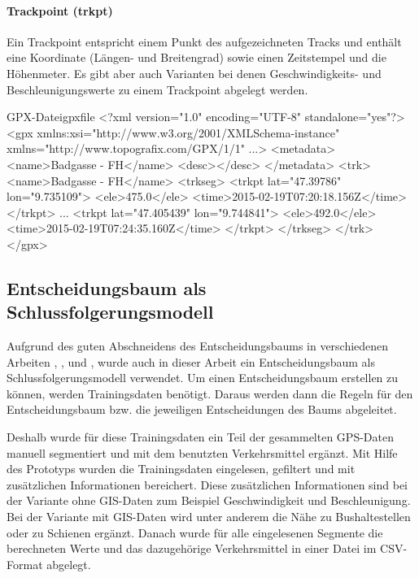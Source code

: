 \paragraph{Trackpoint (trkpt)}
Ein Trackpoint entspricht einem Punkt des aufgezeichneten Tracks und enthält eine Koordinate (Längen- und Breitengrad) sowie einen Zeitstempel und die Höhenmeter. Es gibt aber auch Varianten bei denen Geschwindigkeits- und Beschleunigungswerte zu einem Trackpoint abgelegt werden. \cite{topografix_gpx_2004}
 
\begin{code}[xml]{GPX-Datei}{gpxfile}
<?xml version="1.0" encoding="UTF-8" standalone="yes"?>
<gpx xmlns:xsi="http://www.w3.org/2001/XMLSchema-instance" xmlns="http://www.topografix.com/GPX/1/1" ...>
    <metadata>
        <name>Badgasse - FH</name>
        <desc></desc>
    </metadata>
    <trk>
        <name>Badgasse - FH</name>
        <trkseg>
            <trkpt lat="47.39786" lon="9.735109">
                <ele>475.0</ele>
                <time>2015-02-19T07:20:18.156Z</time>
            </trkpt>
            ...
            <trkpt lat="47.405439" lon="9.744841">
                <ele>492.0</ele>
                <time>2015-02-19T07:24:35.160Z</time>
            </trkpt>
        </trkseg>
    </trk>
</gpx>
\end{code}
\clearpage

\subsection{Entscheidungsbaum als Schlussfolgerungsmodell}
\label{entscheidungsbaumAlsSchlussfolgerungsmodell}
Aufgrund des guten Abschneidens des Entscheidungsbaums in verschiedenen Arbeiten  \cite{stenneth_transportation_2011}, \cite{reddy_using_2010}, \cite{sebastian_nagel_moglichkeitsstudie_2011}und \cite{zheng_learning_2008}, wurde auch in dieser Arbeit ein Entscheidungsbaum als Schlussfolgerungsmodell verwendet. Um einen Entscheidungsbaum erstellen zu können, werden Trainingsdaten benötigt. Daraus werden dann die Regeln für den Entscheidungsbaum bzw. die jeweiligen Entscheidungen des Baums abgeleitet.

Deshalb wurde für diese Trainingsdaten ein Teil der gesammelten GPS-Daten manuell segmentiert und mit dem benutzten Verkehrsmittel ergänzt. Mit Hilfe des Prototyps wurden die Trainingsdaten eingelesen, gefiltert und mit zusätzlichen Informationen bereichert. Diese zusätzlichen Informationen sind bei der Variante ohne GIS-Daten zum Beispiel Geschwindigkeit und Beschleunigung. Bei der Variante mit GIS-Daten wird unter anderem die Nähe zu Bushaltestellen oder zu Schienen ergänzt. Danach wurde für alle eingelesenen Segmente die berechneten Werte und das dazugehörige Verkehrsmittel in einer Datei im CSV-Format abgelegt. 

